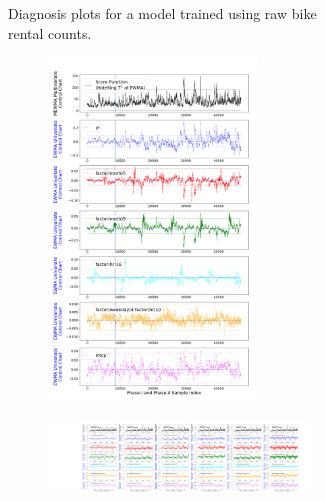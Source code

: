 \documentclass[twoside,11pt]{article}
\begin{document}
\begin{figure}[!htbp]
\begin{subfigure}[t]{0.4\linewidth}
\begin{subfigure}[t]{\linewidth}
     \end{subfigure}
     \caption{Diagnosis plots for a model trained using raw bike rental counts.}
     \label{fig:bs_raw_cnt}
\end{subfigure}
\begin{subfigure}[t]{0.4\linewidth}
     \centering
     \begin{subfigure}[t]{\linewidth}
     \centering
        \includegraphics[width=0.8\textwidth, trim=.0in .0in .0in .0in, clip]{../figures/v14/bike_sharing/reg_lin_cat_norm_syr_10_pow_tr_3/neg_single_bike_fisher_mlines_with_regu_1e-08_0_0001_0_01_99_99.png}
     \end{subfigure}
     \begin{subfigure}[t]{\linewidth}
     \centering
        \includegraphics[width=\textwidth, trim=12.5in 0.5in 3.0in 1.0in, clip]{../figures/v14/bike_sharing/reg_lin_cat_norm_syr_10_pow_tr_3/neg_single_bike_fisher_mlines_with_regu_1e-08_0_0001_0_01_99_99_72.png}

\end{subfigure}
\end{subfigure}
\end{figure}
\end{document}
